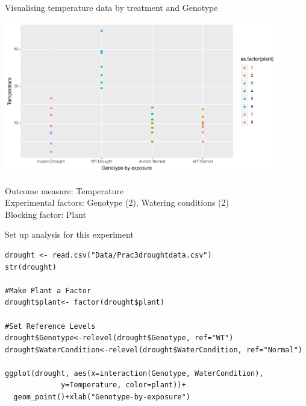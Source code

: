 \documentclass{beamer}
\makeatletter
\newenvironment{kframe}{%
 \def\at@end@of@kframe{}%
 \ifinner\ifhmode%
  \def\at@end@of@kframe{\end{minipage}}%
  \begin{minipage}{\columnwidth}%
 \fi\fi%
 \def\FrameCommand##1{\hskip\@totalleftmargin \hskip-\fboxsep
 \colorbox{shadecolor}{##1}\hskip-\fboxsep
     \hskip-\linewidth \hskip-\@totalleftmargin \hskip\columnwidth}%
 \MakeFramed {\advance\hsize-\width
   \@totalleftmargin\z@ \linewidth\hsize
   \@setminipage}}%
 {\par\unskip\endMakeFramed%
 \at@end@of@kframe}
\newenvironment{knitrout}{}{} %
\makeatother
\begin{document}
\begin{frame}{Visualising temperature data by treatment and Genotype}
 \begin{center}
 \includegraphics[width=0.9\textwidth]{Figures/droughtdata}
 \end{center}
 Outcome measure: Temperature\\
Experimental factors: Genotype (2), Watering conditions (2)\\
Blocking factor: Plant 
\end{frame}

\begin{frame}[fragile]{Set up analysis for this experiment}
 \begin{knitrout}
 \footnotesize
{}\color{fgcolor}\begin{kframe}
\begin{verbatim}
drought <- read.csv("Data/Prac3droughtdata.csv")
str(drought)

#Make Plant a Factor
drought$plant<- factor(drought$plant)

#Set Reference Levels
drought$Genotype<-relevel(drought$Genotype, ref="WT")
drought$WaterCondition<-relevel(drought$WaterCondition, ref="Normal")

ggplot(drought, aes(x=interaction(Genotype, WaterCondition),
		     y=Temperature, color=plant))+
  geom_point()+xlab("Genotype-by-exposure")
\end{verbatim}
\end{kframe}
\end{knitrout}

\end{frame}
\end{document}
